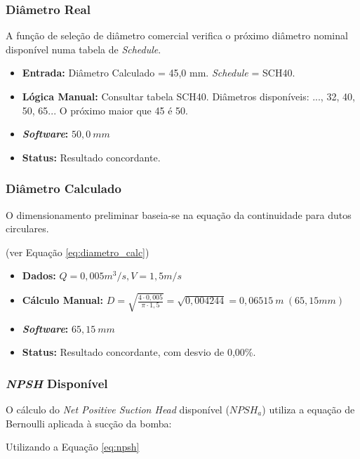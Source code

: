 \subsubsection{Diâmetro Real}
A função de seleção de diâmetro comercial verifica o próximo diâmetro nominal disponível numa tabela de \textit{Schedule}.

\begin{itemize}
    \item \textbf{Entrada:} Diâmetro Calculado = 45,0 mm. \textit{Schedule} = SCH40.
    \item \textbf{Lógica Manual:} Consultar tabela SCH40. Diâmetros disponíveis: ..., 32, 40, 50, 65... O próximo maior que 45 é 50.
    \item \textbf{\textit{Software}:} $50,0 \ mm$
    \item \textbf{Status:} Resultado concordante.
\end{itemize}

\subsubsection{Diâmetro Calculado}
O dimensionamento preliminar baseia-se na equação da continuidade para dutos circulares.

(ver Equação \ref{eq:diametro_calc})

\begin{itemize}
    \item \textbf{Dados:} $Q=0,005 m^3/s, V=1,5 m/s$
    \item \textbf{Cálculo Manual:} $D = \sqrt{\frac{4 \cdot 0,005}{\pi \cdot 1,5}} = \sqrt{0,004244} = 0,06515 \ m \ (65,15 mm)$
    \item \textbf{\textit{Software}:} $65,15 \ mm$
    \item \textbf{Status:} Resultado concordante, com desvio de 0,00\%.
\end{itemize}

\subsubsection{\textit{NPSH} Disponível}
O cálculo do \textit{Net Positive Suction Head} disponível ($NPSH_a$) utiliza a equação de Bernoulli aplicada à sucção da bomba:

\begin{center} Utilizando a Equação \ref{eq:npsh} \end{center}

